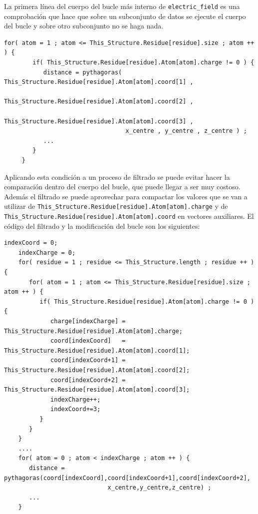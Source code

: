 La primera l\'{i}nea del cuerpo del bucle m\'{a}s interno de
\texttt{electric\_field} es una comprobaci\'{o}n que hace que sobre un
subconjunto de datos se ejecute el cuerpo del bucle y sobre otro subconjunto no
se haga nada.

\clearpage

\begin{lstlisting}[]
     for( atom = 1 ; atom <= This_Structure.Residue[residue].size ; atom ++ ) {
        if( This_Structure.Residue[residue].Atom[atom].charge != 0 ) {
           distance = pythagoras( This_Structure.Residue[residue].Atom[atom].coord[1] ,
                                  This_Structure.Residue[residue].Atom[atom].coord[2] ,
                                  This_Structure.Residue[residue].Atom[atom].coord[3] ,
                                  x_centre , y_centre , z_centre ) ;
           ...
        }
     }
\end{lstlisting}

Aplicando esta condici\'{o}n a un proceso de filtrado se puede evitar hacer la
comparaci\'{o}n dentro del cuerpo del bucle, que puede llegar a ser muy costoso.
Adem\'{a}s el filtrado se puede aprovechar para compactar los valores que se van
a utilizar de \texttt{This\_Structure.Residue[residue].Atom[atom].charge} y de
\texttt{This\_Structure.Residue[residue].Atom[atom].coord} en vectores
auxiliares. El c\'{o}digo del filtrado y la modificaci\'{o}n del bucle son los
siguientes:

\begin{lstlisting}[]
    indexCoord = 0;
    indexCharge = 0;
    for( residue = 1 ; residue <= This_Structure.length ; residue ++ ) {
       for( atom = 1 ; atom <= This_Structure.Residue[residue].size ; atom ++ ) {
          if( This_Structure.Residue[residue].Atom[atom].charge != 0 ) {
             charge[indexCharge] = This_Structure.Residue[residue].Atom[atom].charge;
             coord[indexCoord]   = This_Structure.Residue[residue].Atom[atom].coord[1];
             coord[indexCoord+1] = This_Structure.Residue[residue].Atom[atom].coord[2];
             coord[indexCoord+2] = This_Structure.Residue[residue].Atom[atom].coord[3];
             indexCharge++;
             indexCoord+=3;
          }
       }
    }
    ....
    for( atom = 0 ; atom < indexCharge ; atom ++ ) {
       distance = pythagoras(coord[indexCoord],coord[indexCoord+1],coord[indexCoord+2],
                             x_centre,y_centre,z_centre) ;
       ...
    }
\end{lstlisting}

